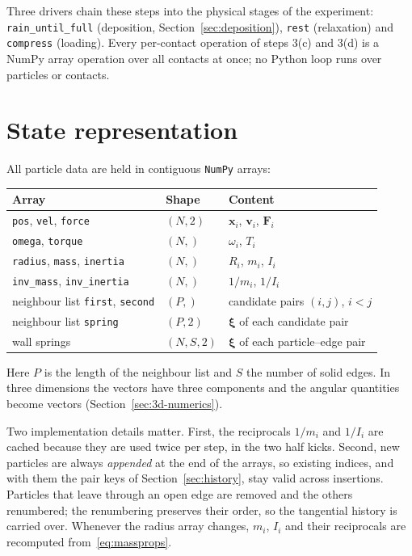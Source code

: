 Three drivers chain these steps into the physical stages of the experiment:
\texttt{rain\_until\_full} (deposition, Section~\ref{sec:deposition}),
\texttt{rest} (relaxation) and \texttt{compress} (loading).  Every per-contact
operation of steps 3(c) and 3(d) is a NumPy array operation over all contacts
at once; no Python loop runs over particles or contacts.

\section{State representation}
\label{sec:state}

All particle data are held in contiguous \texttt{NumPy} arrays:

\begin{center}
\begin{tabular}{lll}
  \toprule
  Array & Shape & Content \\
  \midrule
  \texttt{pos}, \texttt{vel}, \texttt{force} & $(N,2)$ & $\mathbf{x}_{i}$, $\mathbf{v}_{i}$, $\mathbf{F}_{i}$ \\
  \texttt{omega}, \texttt{torque}            & $(N,)$  & $\omega_{i}$, $T_{i}$ \\
  \texttt{radius}, \texttt{mass}, \texttt{inertia} & $(N,)$ & $R_{i}$, $m_{i}$, $I_{i}$ \\
  \texttt{inv\_mass}, \texttt{inv\_inertia}  & $(N,)$  & $1/m_{i}$, $1/I_{i}$ \\
  neighbour list \texttt{first}, \texttt{second} & $(P,)$ & candidate pairs $(i,j)$, $i<j$ \\
  neighbour list \texttt{spring}             & $(P,2)$ & $\boldsymbol{\xi}$ of each candidate pair \\
  wall springs                               & $(N,S,2)$ & $\boldsymbol{\xi}$ of each particle--edge pair \\
  \bottomrule
\end{tabular}
\end{center}
Here $P$ is the length of the neighbour list and $S$ the number of solid edges.
In three dimensions the vectors have three components and the angular quantities become vectors (Section~\ref{sec:3d-numerics}).

Two implementation details matter.  First, the reciprocals $1/m_{i}$ and
$1/I_{i}$ are cached because they are used twice per step, in the two half
kicks.  Second, new particles are always \emph{appended} at the end of the
arrays, so existing indices, and with them the pair keys of
Section~\ref{sec:history}, stay valid across insertions.  Particles that leave
through an open edge are removed and the others renumbered; the renumbering
preserves their order, so the tangential history is carried over.  Whenever the
radius array changes, $m_{i}$, $I_{i}$ and their reciprocals are recomputed
from~\eqref{eq:massprops}.

